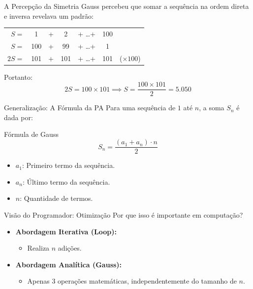 \documentclass[aspectratio=169]{beamer}
\begin{document}
\begin{frame}{A Percepção da Simetria}
    Gauss percebeu que somar a sequência na ordem direta e inversa revelava um padrão:
    \vfill
    \begin{center}
        \begin{tabular}{rcccccl}
            $S =$ & 1 & + & 2 & + \dots + & 100 & \\
            $S =$ & 100 & + & 99 & + \dots + & 1 & \\ \hline
            $2S =$ & 101 & + & 101 & + \dots + & 101 & ($\times 100$)
        \end{tabular}
    \end{center}
    \vfill
    Portanto:
    \[ 2S = 100 \times 101 \implies S = \frac{100 \times 101}{2} = 5.050 \]
\end{frame}

\begin{frame}{Generalização: A Fórmula da PA}
    Para uma sequência de $1$ até $n$, a soma $S_n$ é dada por:
    \begin{block}{Fórmula de Gauss}
        \[ S_n = \frac{(a_1 + a_n) \cdot n}{2} \]
    \end{block}
    \begin{itemize}
        \item $a_1$: Primeiro termo da sequência.
        \item $a_n$: Último termo da sequência.
        \item $n$: Quantidade de termos.
    \end{itemize}
\end{frame}

\begin{frame}{Visão do Programador: Otimização}
    Por que isso é importante em computação?
    \begin{itemize}
        \item \textbf{Abordagem Iterativa (Loop):} 
        \begin{itemize}
            \item Realiza $n$ adições.
        \end{itemize}
        \item \textbf{Abordagem Analítica (Gauss):}
        \begin{itemize}
            \item Apenas 3 operações matemáticas, independentemente do tamanho de $n$.
        \end{itemize}
    \end{itemize}
\end{frame}
\end{document}
